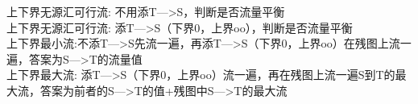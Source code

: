 上下界无源汇可行流: 不用添T—>S，判断是否流量平衡\\
上下界无源汇可行流: 添T—>S（下界0，上界oo），判断是否流量平衡\\
上下界最小流:不添T—>S先流一遍，再添T—>S（下界0，上界oo）在残图上流一遍，答案为S—>T的流量值\\
上下界最大流: 添T—>S（下界0，上界oo）流一遍，再在残图上流一遍S到T的最大流，答案为前者的S—>T的值+残图中S—>T的最大流\\
